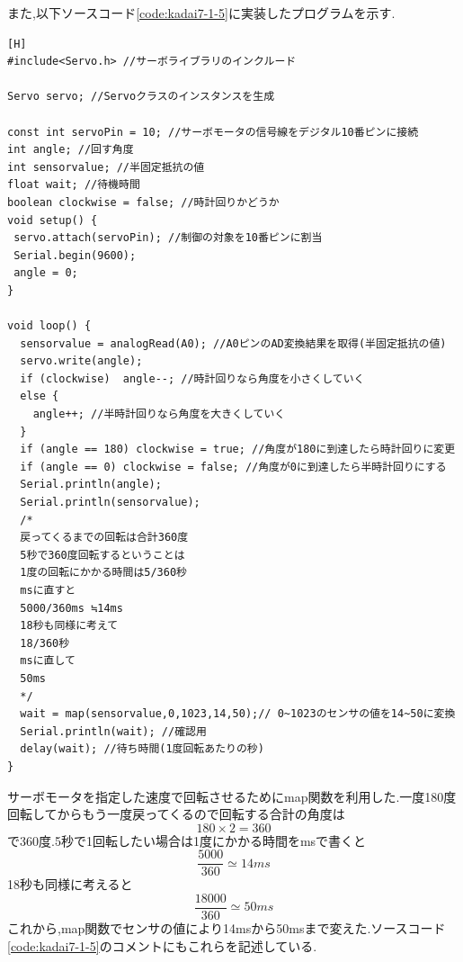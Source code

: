 \documentclass{jarticle}
\begin{document}
また,以下ソースコード\ref{code:kadai7-1-5}に実装したプログラムを示す.
\begin{lstlisting}[caption = 課題7.1.5,label=code:kadai7-1-5][H]
#include<Servo.h> //サーボライブラリのインクルード

Servo servo; //Servoクラスのインスタンスを生成

const int servoPin = 10; //サーボモータの信号線をデジタル10番ピンに接続
int angle; //回す角度
int sensorvalue; //半固定抵抗の値
float wait; //待機時間
boolean clockwise = false; //時計回りかどうか
void setup() {
 servo.attach(servoPin); //制御の対象を10番ピンに割当
 Serial.begin(9600);
 angle = 0;
}

void loop() { 
  sensorvalue = analogRead(A0); //A0ピンのAD変換結果を取得(半固定抵抗の値)
  servo.write(angle);
  if (clockwise)  angle--; //時計回りなら角度を小さくしていく
  else {
    angle++; //半時計回りなら角度を大きくしていく
  }
  if (angle == 180) clockwise = true; //角度が180に到達したら時計回りに変更
  if (angle == 0) clockwise = false; //角度が0に到達したら半時計回りにする
  Serial.println(angle);
  Serial.println(sensorvalue);
  /*
  戻ってくるまでの回転は合計360度
  5秒で360度回転するということは
  1度の回転にかかる時間は5/360秒
  msに直すと
  5000/360ms ≒14ms
  18秒も同様に考えて
  18/360秒
  msに直して
  50ms
  */
  wait = map(sensorvalue,0,1023,14,50);// 0~1023のセンサの値を14~50に変換
  Serial.println(wait); //確認用
  delay(wait); //待ち時間(1度回転あたりの秒)
}
\end{lstlisting}
サーボモータを指定した速度で回転させるためにmap関数を利用した.一度180度回転してからもう一度戻ってくるので回転する合計の角度は
\begin{equation}
180 \times 2 = 360
\end{equation}
で360度.5秒で1回転したい場合は1度にかかる時間をmsで書くと
\begin{equation}
\frac{5000}{360} \simeq 14ms
\end{equation}
18秒も同様に考えると
\begin{equation}
\frac{18000}{360} \simeq 50ms
\end{equation}
これから,map関数でセンサの値により14msから50msまで変えた.ソースコード\ref{code:kadai7-1-5}のコメントにもこれらを記述している.
\end{document}
